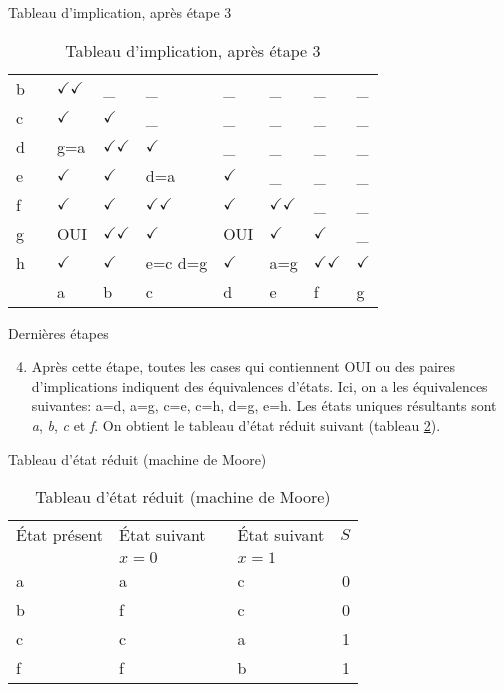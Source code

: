 \documentclass[presentation]{beamer}
\begin{document}
\begin{frame}[label={sec:org03fcbc1}]{Tableau d'implication, après étape 3}
\begin{table}[htbp]
\caption{\label{tab:org320904e}Tableau d'implication, après étape 3}
\centering
\begin{tabular}{lllllllll}
b &  & \(\checkmark \checkmark\) & \_ & \_ & \_ & \_ & \_ & \_\\
c &  & \(\checkmark\) & \(\checkmark\) & \_ & \_ & \_ & \_ & \_\\
d &  & g=a & \(\checkmark \checkmark\) & \(\checkmark\) & \_ & \_ & \_ & \_\\
e &  & \(\checkmark\) & \(\checkmark\) & d=a & \(\checkmark\) & \_ & \_ & \_\\
f &  & \(\checkmark\) & \(\checkmark\) & \(\checkmark \checkmark\) & \(\checkmark\) & \(\checkmark \checkmark\) & \_ & \_\\
g &  & OUI & \(\checkmark \checkmark\) & \(\checkmark\) & OUI & \(\checkmark\) & \(\checkmark\) & \_\\
h &  & \(\checkmark\) & \(\checkmark\) & e=c d=g & \(\checkmark\) & a=g & \(\checkmark \checkmark\) & \(\checkmark\)\\
\hline
 &  & a & b & c & d & e & f & g\\
\end{tabular}
\end{table}
\end{frame}

\begin{frame}[label={sec:orgc93b92b}]{Dernières étapes}
\begin{enumerate}
\setcounter{enumi}{3}
\item Après cette étape, toutes les  cases qui contiennent OUI ou des
paires d'implications indiquent des équivalences d'états. Ici, on a
les équivalences suivantes: a=d, a=g, c=e, c=h, d=g, e=h. Les états
uniques résultants sont \emph{a}, \emph{b}, \emph{c} et \emph{f}. On obtient le tableau
d'état réduit suivant (tableau \ref{tab:orgc66c085}).
\end{enumerate}
\end{frame}

\begin{frame}[label={sec:orgc8eb8a2}]{Tableau d'état réduit (machine de Moore)}
\begin{table}[htbp]
\caption{\label{tab:orgc66c085}Tableau d'état réduit (machine de Moore)}
\centering
\begin{tabular}{llllr}
État présent & État suivant &  & État suivant & \(S\)\\
 & \(x=0\) &  & \(x=1\) & \\
\hline
a & a &  & c & 0\\
b & f &  & c & 0\\
c & c &  & a & 1\\
f & f &  & b & 1\\
\end{tabular}
\end{table}
\end{frame}
\end{document}
